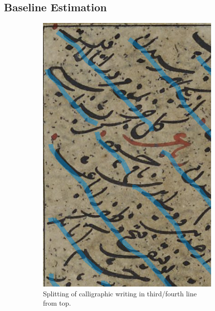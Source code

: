 \subsection{Baseline Estimation}

\begin{figure}[ht!]
	\centering
	\begin{subfigure}[t]{.475\columnwidth}
		\includegraphics[width=\textwidth]{fail_calli.jpg}
		\caption{Splitting of calligraphic writing in third/fourth line from top.}
		\label{fig:calli}
	\end{subfigure}
	\hfill
	\begin{subfigure}[t]{.475\columnwidth}

\end{subfigure}
\end{figure}

